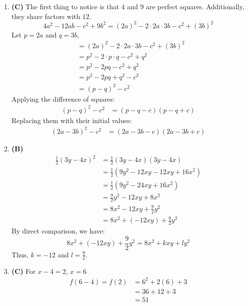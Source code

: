\begin{multicols}{2}
\begin{enumerate}[label={\textbf{\arabic*.}}]
    \item \textbf{(C)} The first thing to notice is that \(4\) and \(9\) are perfect squares. Additionally, they share factors with \(12\).
        \[4a^2 - 12ab - c^2 + 9b^2 = (2a)^2 - 2 \cdot 2a \cdot 3b - c^2 + (3b)^2\]
        Let \(p = 2a\) and \(q = 3b\),
        \begin{align*}
            &= (2a)^2 - 2 \cdot 2a \cdot 3b - c^2 + (3b)^2 \\
            &= p^2 - 2 \cdot p \cdot q - c^2 + q^2 \\
            &= p^2 - 2pq - c^2 + q^2 \\
            &= p^2 - 2pq + q^2 - c^2 \\
            &= (p - q)^2 - c^2
        \end{align*}
        Applying the difference of squares:
        \begin{align*}
            (p - q)^2 - c^2 &= (p - q - c)(p - q + c)
        \end{align*}
        Replacing them with their initial values:
        \begin{align*}
            (2a - 3b)^2 - c^2 &= (2a - 3b - c)(2a - 3b + c)
        \end{align*}

        \item \textbf{(B)} 
        \begin{align*}
            \frac{1}{2}(3y - 4x)^2 &= \frac{1}{2}(3y - 4x)(3y - 4x) \\
            &= \frac{1}{2}(9y^2 - 12xy - 12xy + 16x^2) \\
            &= \frac{1}{2}(9y^2 - 24xy + 16x^2) \\
            &= \frac{9}{2}y^2 - 12xy + 8x^2 \\ 
            &= 8x^2 - 12xy + \frac{9}{2}y^2 \\ 
            &= 8x^2 + (-12xy) + \frac{9}{2}y^2
        \end{align*}
        By direct comparison, we have:
        \[8x^2 + (-12xy) + \frac{9}{2}y^2 = 8x^2 + kxy + ly^2\]
        Thus, \( k = -12 \) and \( l = \frac{9}{2} \).
        

    \item \textbf{(C)} For \(x - 4 = 2\), \(x = 6\) 
    \begin{align*} 
        f(6 - 4) = f(2) &= 6^2 + 2(6) + 3 \\
        & = 36 + 12 + 3 \\
        & = 51
    \end{align*}


\end{enumerate}
\end{multicols}
